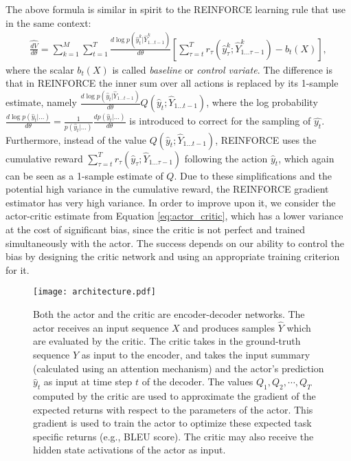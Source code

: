 \documentclass{article} \usepackage{iclr2017_conference,times}
\begin{document}
The above formula is similar in spirit to the REINFORCE learning rule that \citet{ranzato2015sequence} use in the same context:
\begin{align}
    \widehat{\frac{dV}{d\theta}} = 
    \sum\limits_{k=1}^M
    \sum\limits_{t=1}^T
    \frac{ d\log p(\hat{y}^k_t|\hat{Y}^k_{1 \ldots t - 1}) }{d\theta}
    \left[
    \sum_{\tau=t}^T r_{\tau}(\hat{y}^k_{\tau}; \hat{Y}^k_{1 \ldots \tau - 1})
    - b_t(X)
    \right],
\end{align}
where the scalar $b_t(X)$ is called \textit{baseline} or \textit{control variate}.
The difference is that in REINFORCE the inner
sum over all actions is replaced by its 1-sample estimate, namely
$\frac{d \log p(\hat{y}_t|\hat{Y}_{1 \ldots t - 1})}{d\theta}
Q(\hat{y}_t;\hat{Y}_{1 \ldots t - 1})$, where the log probability 
$\frac{d \log p(\hat{y}_t|...)}{d\theta}=
\frac{1}{p(\hat{y}_t|...)}
\frac{d p(\hat{y}_t|...)}{d\theta}$ is introduced
to correct for the sampling of $\hat{y_t}$.
Furthermore, instead of the value $Q(\hat{y}_t;\hat{Y}_{1 \ldots t - 1})$, REINFORCE uses
the cumulative reward  
$\sum_{\tau=t}^T r_{\tau}(\hat{y}_{\tau}; \hat{Y}_{1 \ldots \tau - 1})$
following the action $\hat{y}_t$, which again can be seen as a 1-sample estimate of $Q$.
Due to these simplifications and the potential high variance in the cumulative reward, the REINFORCE
gradient estimator has very high variance. In order to improve upon it, we
consider the actor-critic estimate from Equation \ref{eq:actor_critic}, which has a lower variance 
at the cost of significant bias, since the critic is not perfect and trained simultaneously
with the actor. The success depends on our ability to control the bias
by designing the critic network and using an appropriate training criterion for it.

\begin{figure}
    \centering
    \texttt{[image: architecture.pdf]}
    \caption{Both the actor and the critic are encoder-decoder networks. The actor receives an input sequence $X$ and produces samples
        $\hat{Y}$ which are evaluated by the critic. The critic takes in the ground-truth 
        sequence $Y$ as input to the encoder, 
        and takes the input summary (calculated using an attention mechanism) and the 
        actor's prediction $\hat{y}_t$ as input at time step $t$ of the decoder.  
    The values $Q_1,Q_2,\cdots,Q_T$ computed by the critic are used to approximate the gradient of the
    expected returns with respect to the parameters of the actor. This gradient
    is used to train the actor to optimize these expected task specific returns
    (e.g., BLEU score). The critic may also receive the hidden state activations of the actor as input.}
\label{fig:arch}
\end{figure}
\end{document}
